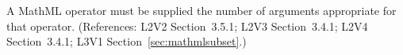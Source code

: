 A MathML operator must be supplied the number of arguments appropriate for
that operator.  (References: L2V2 Section~3.5.1; L2V3 Section~3.4.1; 
L2V4 Section~3.4.1; L3V1 Section~\ref{sec:mathmlsubset}.)
